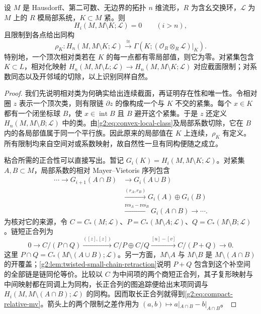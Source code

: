 \begin{lemma}\label{g2:lem:compact-localization}
	设 \(M\) 是 Hausdorff、第二可数、无边界的拓扑 \(n\) 维流形，\(R\) 为含幺交换环，\(\mathcal L\) 为 \(M\) 上的 \(R\) 模局部系统，\(K\subset M\) 紧。则
	\[
		H_i(M,M\setminus K;\mathcal L)=0\qquad(i>n),
	\]
	且限制到各点给出同构
	\begin{equation}\label{g2:eq:compact-localization}
		\rho_K:H_n(M,M\setminus K;\mathcal L)
		\xrightarrow{\ \cong\ }\Gamma(K;(\mathcal O_R\otimes_R\mathcal L)|_K).
	\end{equation}
	特别地，一个顶次相对类若在 \(K\) 的每一点都有零局部值，则它为零。对紧集包含 \(K\subset L\)，相对化映射 \(H_n(M,M\setminus L;\mathcal L)\to H_n(M,M\setminus K;\mathcal L)\) 对应截面限制；对系数同态以及开邻域的切除，以上识别同样自然。
\end{lemma}
\begin{proof}
	我们先说明相对类为何确实给出连续截面，再证明存在性和唯一性。令相对圈 \(z\) 表示一个顶次类，则有限链 \(\partial z\) 的像构成一个与 \(K\) 不交的紧集。每个 \(x\in K\) 都有一个闭坐标球 \(B\)，使 \(x\in\operatorname{int}B\) 且 \(B\) 避开这个紧集。于是 \(z\) 还定义 \(H_n(M,M\setminus B;\mathcal L)\) 中的类。由\eqref{g2:eq:convex-local-class}及局部系数切除，它在 \(B\) 内的各局部值属于同一个平行族。因此原来的局部值在 \(K\) 上连续，\(\rho_K\) 有定义。所有限制均来自空间对或系数映射，故自然性一旦有同构便随之成立。

	粘合所需的正合性可以直接写出。暂记 \(G_i(K)=H_i(M,M\setminus K;\mathcal L)\)。对紧集 \(A,B\subset M\)，局部系数的相对 Mayer--Vietoris 序列包含
	\begin{equation}\label{g2:eq:compact-relative-mv}
		\begin{aligned}
			\cdots\longrightarrow G_{i+1}(A\cap B)&\longrightarrow G_i(A\cup B)\\
			&\xrightarrow{(r_A,r_B)}G_i(A)\oplus G_i(B)\\
			&\xrightarrow{\mathrm{res}_A-\mathrm{res}_B}G_i(A\cap B)\longrightarrow\cdots.
		\end{aligned}
	\end{equation}
	为核对它的来源，令 \(C=C_*(M;\mathcal L)\)、\(P=C_*(M\setminus A;\mathcal L)\)、\(Q=C_*(M\setminus B;\mathcal L)\)。链短正合列为
	\[
		0\longrightarrow C/(P\cap Q)\xrightarrow{([z],[z])}C/P\oplus C/Q
		\xrightarrow{[u]-[v]}C/(P+Q)\longrightarrow0.
	\]
	这里 \(P\cap Q=C_*(M\setminus(A\cup B);\mathcal L)\)。另一方面，\(M\setminus A\) 与 \(M\setminus B\) 是 \(M\setminus(A\cap B)\) 的开覆盖；\cref{g2:lem:twisted-small-chain-retraction}说明 \(P+Q\) 包含到这个补空间的全部链是链同伦等价。比较以 \(C\) 为中间项的两个商短正合列，其子复形映射与中间映射都在同调上为同构，长正合列的图追踪便给出末项同调与 \(H_i(M,M\setminus(A\cap B);\mathcal L)\) 的同构。因而取长正合列就得到\eqref{g2:eq:compact-relative-mv}。箭头上的两个限制之差作用为 \((a,b)\mapsto a|_{A\cap B}-b|_{A\cap B}\)。


\end{proof}
